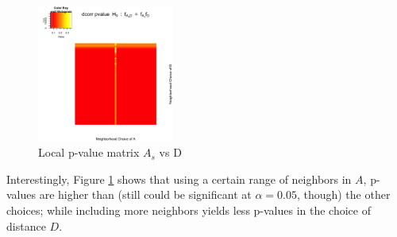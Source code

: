 \documentclass[12pt]{report}
\begin{document}
 
\begin{figure}[H]
\captionsetup{format=plain}
\centering
\includegraphics[width=0.4\textwidth]{../figure/P_A_D.png}
\caption{Local p-value matrix $A_{s}$ vs D}
\label{fig:PAD}
\end{figure} 

Interestingly, Figure \ref{fig:PAD} shows that using a certain range of neighbors in $A$, p-values are higher than (still could be significant at $\alpha = 0.05$, though) the other choices; while including more neighbors yields less p-values in the choice of distance $D$.  
 
 
 
\end{document}
